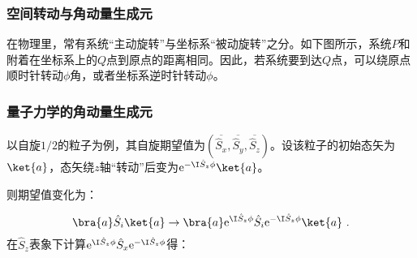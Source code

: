 
\begin{issues}
\issueMissDepend
\issueTODO
\end{issues}

\subsubsection{空间转动与角动量生成元}
在物理里，常有系统“主动旋转”与坐标系“被动旋转”之分。如下图所示，系统$P$和附着在坐标系上的$Q$点到原点的距离相同。因此，若系统要到达$Q$点，可以绕原点顺时针转动$\phi$角，或者坐标系逆时针转动$\phi$。

\subsubsection{量子力学的角动量生成元}
以自旋$1/2$的粒子为例，其自旋期望值为$(\overline{\hat S_x},\overline{\hat S_y},\overline{\hat S_z})$。设该粒子的初始态矢为$\ket{a}$，态矢绕$z$轴“转动”后变为$\mathrm e^{- \I\hat S_z\phi}\ket{a}$。

则期望值变化为：

\begin{equation}
\bra{a}\hat S_i\ket{a}\rightarrow \bra{a}\mathrm e^{ \I\hat S_z\phi}\hat S_i\mathrm e^{- \I\hat S_z\phi}\ket{a}~.
\end{equation}
在$\hat S_z$表象下计算$\mathrm e^{ \I\hat S_z\phi}\hat S_x\mathrm e^{- \I\hat S_z\phi}$得：

